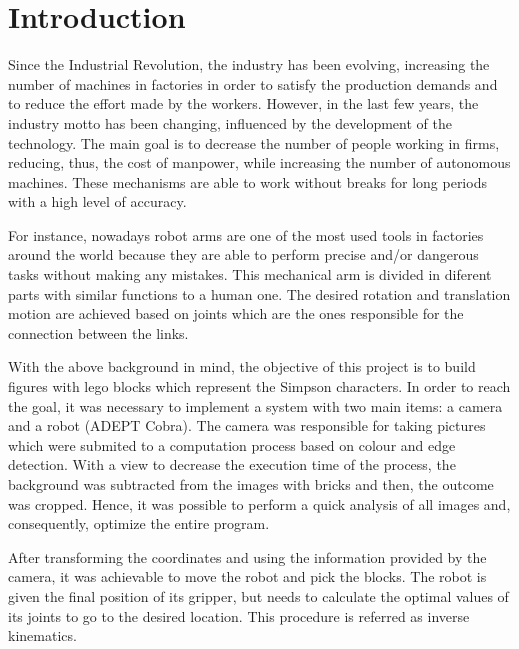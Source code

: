\chapter{Introduction}\label{ch:introduction}

Since the Industrial Revolution, the industry has been evolving, increasing the number of machines in factories in order to satisfy the production demands and to reduce the effort made by the workers. However, in the last few years, the industry motto has been changing, influenced by the development of the technology. The main goal is to decrease the number of people working in firms, reducing, thus, the cost of manpower, while increasing the number of autonomous machines. These mechanisms are able to work without breaks for long periods with a high level of accuracy. 

For instance, nowadays robot arms are one of the most used tools in factories around the world because they are able to perform precise and/or dangerous tasks without making any mistakes. This mechanical arm is divided in diferent parts with similar functions to a human one. The desired rotation and translation motion are achieved based on joints which are the ones responsible for the connection between the links. 

With the above background in mind, the objective of this project is to build figures with lego blocks which represent the Simpson characters. In order to reach the goal, it was necessary to implement a system with two main items: a camera and a robot (ADEPT Cobra). The camera was responsible for taking pictures which were submited to a computation process based on colour and edge detection. With a view to decrease the execution time of the process, the background was subtracted from the images with bricks and then, the outcome was cropped. Hence, it was possible to perform a quick analysis of all images and, consequently, optimize the entire program.

After transforming the coordinates and using the information provided by the camera, it was achievable to move the robot and pick the blocks. The robot is given the final position of its gripper, but needs to calculate the optimal values of its joints to go to the desired location. This procedure is referred as inverse kinematics.

